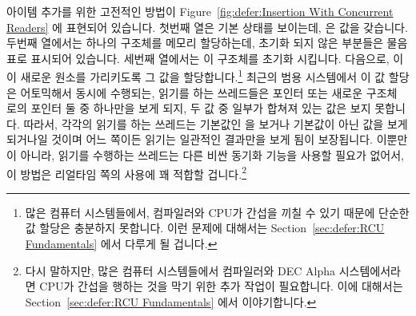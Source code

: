 아이템 추가를 위한 고전적인 방법이
Figure~\ref{fig:defer:Insertion With Concurrent Readers} 에 표현되어 있습니다.
첫번째 열은 기본 상태를 보이는데,  은  값을 갖습니다.
두번째 열에서는 하나의 구조체를 메모리 할당하는데, 초기화 되지 않은 부분들은
물음표로 표시되어 있습니다.
세번째 열에서는 이 구조체를 초기화 시킵니다.
다음으로,  이 이 새로운 원소를 가리키도록 그 값을
할당합니다.\footnote{
	많은 컴퓨터 시스템들에서, 컴파일러와 CPU가 간섭을 끼칠 수 있기 때문에
	단순한 값 할당은 충분하지 못합니다.
	이런 문제에 대해서는 Section~\ref{sec:defer:RCU Fundamentals} 에서
	다루게 될 겁니다.}
최근의 범용 시스템에서 이 값 할당은 어토믹해서 동시에 수행되는, 읽기를 하는
쓰레드들은  포인터 또는 새로운 구조체  로의 포인터 둘 중
하나만을 보게 되지, 두 값 중 일부가 합쳐져 있는 값은 보지 못합니다.
따라서, 각각의 읽기를 하는 쓰레드는 기본값인  을 보거나
기본값이 아닌 값을 보게 되거나일 것이며 어느 쪽이든 읽기는 일관적인 결과만을
보게 됨이 보장됩니다.
이뿐만이 아니라, 읽기를 수행하는 쓰레드는 다른 비싼 동기화 기능을 사용할 필요가
없어서, 이 방법은 리얼타임 쪽의 사용에 꽤 적합할 겁니다.\footnote{
	다시 말하지만, 많은 컴퓨터 시스템들에서 컴파일러와 DEC Alpha
	시스템에서라면 CPU가 간섭을 행하는 것을 막기 위한 추가 작업이
	필요합니다.
	이에 대해서는 Section~\ref{sec:defer:RCU Fundamentals} 에서
	이야기합니다.}

